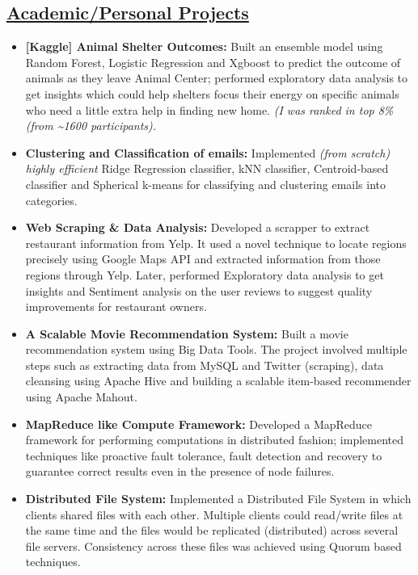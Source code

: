 \documentclass[10pt]{article}
\begin{document}
\subsection*{\underline{Academic/Personal Projects}}
\vspace{-0.05cm}
\begin{itemize}[leftmargin=0.15in]
\item {\bfseries [Kaggle] Animal Shelter Outcomes:} Built an ensemble model using Random Forest, Logistic Regression and Xgboost to predict the outcome of animals as they leave Animal Center; performed exploratory data analysis to get insights which could help shelters focus their energy on specific animals who need a little extra help in finding new home. \textit{(I was ranked in top 8\% (from \~{}1600 participants).}

\item {\bfseries Clustering and Classification of emails:} Implemented  \textit{(from scratch) highly efficient} Ridge Regression classifier, kNN classifier, Centroid-based classifier and Spherical k-means for classifying and clustering emails into categories.

\item {\bfseries Web Scraping \& Data Analysis:} Developed a scrapper to extract restaurant information from Yelp. It used a novel technique to locate regions precisely using Google Maps API and extracted information from those regions through Yelp. Later, performed Exploratory data analysis to get insights and Sentiment analysis on the user reviews to suggest quality improvements for restaurant owners.

\item {\bfseries A Scalable Movie Recommendation System:} Built a movie recommendation system using Big Data Tools. The project involved multiple steps such as extracting data from MySQL and Twitter (scraping), data cleansing using Apache Hive and building a scalable item-based recommender using Apache Mahout.

\item {\bfseries MapReduce like Compute Framework:} Developed a MapReduce framework for performing computations in distributed fashion; implemented techniques like proactive fault tolerance, fault detection and recovery to guarantee correct results even in the presence of node failures.

\item {\bfseries Distributed File System:} Implemented a Distributed File System in which clients shared files with each other. Multiple clients could read/write files at the same time and the files would be replicated (distributed) across several file servers. Consistency across these files was achieved using Quorum based techniques.

\end{itemize}
\end{document}
